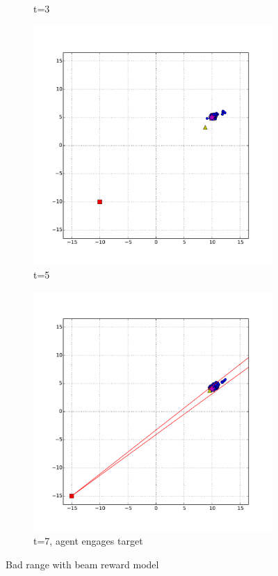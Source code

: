 \begin{figure}
\begin{subfigure}[b]{0.3\textwidth}
                \caption{t=3}
                \label{fig:beam_bad_range_t_3}
        \end{subfigure}
        \begin{subfigure}[b]{0.3\textwidth}
                \includegraphics[width=\textwidth]{beam_bad_range_t_5}
                \caption{t=5}
                \label{fig:beam_bad_range_t_5}
        \end{subfigure}
        \begin{subfigure}[b]{0.3\textwidth}
                \includegraphics[width=\textwidth]{beam_bad_range_t_7}
                \caption{t=7, agent engages target}
                \label{fig:beam_bad_range_t_7}
        \end{subfigure}
        \caption{Bad range with beam reward model}\label{fig:beam_bad_range}
\end{figure}